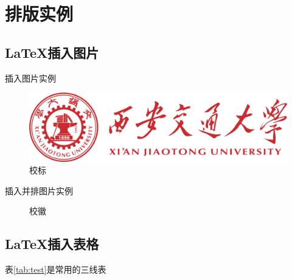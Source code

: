 \documentclass[bachelor]{XJTUthesis}
\begin{document}
\chapter{排版实例}
\section{\LaTeX 插入图片}

插入图片实例
\begin{figure}[htbp]
  \centering
  \includegraphics[width=\textwidth]{./figures/a4_2xbred.png}
  \caption{校标}
\end{figure}

插入并排图片实例
\begin{figure}[htbp]
\centering
{}
\qquad \qquad
{}
\caption{校徽}
\label{jdxh}
\end{figure}

\section{\LaTeX 插入表格}
表\ref{tab:test}是常用的三线表
\end{document}
